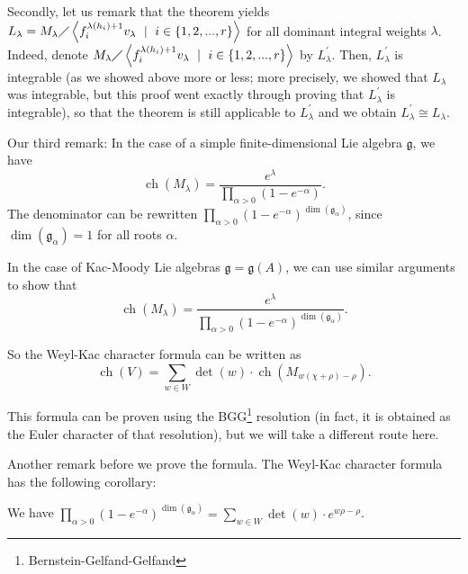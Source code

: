 \documentclass[etingof-lie.tex]{subfiles}
\begin{document}
Secondly, let us remark that the theorem yields $L_{\lambda}=M_{\lambda
}\diagup\left\langle f_{i}^{\lambda\left(  h_{i}\right)  +1}v_{\lambda}%
\ \mid\ i\in\left\{  1,2,...,r\right\}  \right\rangle $ for all dominant
integral weights $\lambda$. Indeed, denote $M_{\lambda}\diagup\left\langle
f_{i}^{\lambda\left(  h_{i}\right)  +1}v_{\lambda}\ \mid\ i\in\left\{
1,2,...,r\right\}  \right\rangle $ by $L_{\lambda}^{\prime}$. Then,
$L_{\lambda}^{\prime}$ is integrable (as we showed above more or less; more
precisely, we showed that $L_{\lambda}$ was integrable, but this proof went
exactly through proving that $L_{\lambda}^{\prime}$ is integrable), so that
the theorem is still applicable to $L_{\lambda}^{\prime}$ and we obtain
$L_{\lambda}^{\prime}\cong L_{\lambda}$.

Our third remark: In the case of a simple finite-dimensional Lie algebra
$\mathfrak{g}$, we have%
\[
\operatorname*{ch}\left(  M_{\lambda}\right)  =\dfrac{e^{\lambda}}%
{\prod\limits_{\alpha>0}\left(  1-e^{-\alpha}\right)  }.
\]
The denominator can be rewritten $\prod\limits_{\alpha>0}\left(  1-e^{-\alpha
}\right)  ^{\dim\left(  \mathfrak{g}_{\alpha}\right)  }$, since $\dim\left(
\mathfrak{g}_{\alpha}\right)  =1$ for all roots $\alpha$.

In the case of Kac-Moody Lie algebras $\mathfrak{g}=\mathfrak{g}\left(
A\right)  $, we can use similar arguments to show that%
\[
\operatorname*{ch}\left(  M_{\lambda}\right)  =\dfrac{e^{\lambda}}%
{\prod\limits_{\alpha>0}\left(  1-e^{-\alpha}\right)  ^{\dim\left(
\mathfrak{g}_{\alpha}\right)  }}.
\]


So the Weyl-Kac character formula can be written as%
\[
\operatorname*{ch}\left(  V\right)  =\sum\limits_{w\in W}\det\left(  w\right)
\cdot\operatorname*{ch}\left(  M_{w\left(  \chi+\rho\right)  -\rho}\right)  .
\]


This formula can be proven using the BGG\footnote{Bernstein-Gelfand-Gelfand}
resolution (in fact, it is obtained as the Euler character of that
resolution), but we will take a different route here.

Another remark before we prove the formula. The Weyl-Kac character formula has
the following corollary:

\begin{corollary}
We have $\prod\limits_{\alpha>0}\left(
1-e^{-\alpha}\right)  ^{\dim\left(  \mathfrak{g}_{\alpha}\right)  }%
=\sum\limits_{w\in W}\det\left(  w\right)  \cdot e^{w\rho-\rho}$.
\end{corollary}
\end{document}
